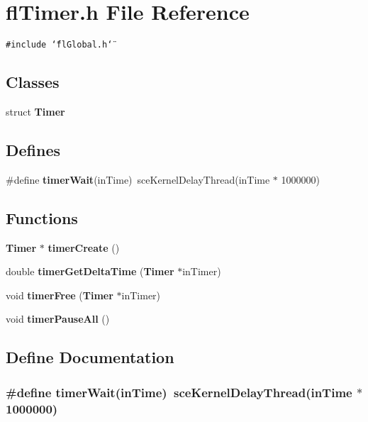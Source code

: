 \section{fl\-Timer.h File Reference}
\label{flTimer_8h}
{\tt \#include \char`\"{}fl\-Global.h\char`\"{}}\par
\subsection*{Classes}
\begin{CompactItemize}
\item 
struct {\bf Timer}
\end{CompactItemize}
\subsection*{Defines}
\begin{CompactItemize}
\item 
\#define {\bf timer\-Wait}(in\-Time)~sce\-Kernel\-Delay\-Thread(in\-Time $\ast$ 1000000)
\end{CompactItemize}
\subsection*{Functions}
\begin{CompactItemize}
\item 
{\bf Timer} $\ast$ {\bf timer\-Create} ()
\item 
double {\bf timer\-Get\-Delta\-Time} ({\bf Timer} $\ast$in\-Timer)
\item 
void {\bf timer\-Free} ({\bf Timer} $\ast$in\-Timer)
\item 
void {\bf timer\-Pause\-All} ()
\end{CompactItemize}


\subsection{Define Documentation}
\subsubsection{\setlength{\rightskip}{0pt plus 5cm}\#define timer\-Wait(in\-Time)~sce\-Kernel\-Delay\-Thread(in\-Time $\ast$ 1000000)}\label{flTimer_8h_67ac4c64ee897edcf305c586600a7a2c}




